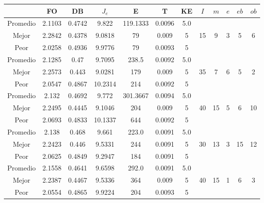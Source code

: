 \begin{table}[h!]
    \footnotesize
    \begin{center}
        \begin{tabular}{|c|c|c|c|c|c|c|c|c|c|c|c|}
        \hline
             & {\bf FO} & {\bf DB} & $J_e$ & {\bf E} & {\bf T} & {\bf KE} & $I$ & $m$ & $e$ & $eb$ & $ob$ \\
        \hline
        \hline
            Promedio  & 2.1103 & 0.4742 & 9.822 & 119.1333 & 0.0096 & 5.0 &  &  &  &  & \\
            \cline{1-7}
            Mejor & 2.2842 & 0.4378  & 9.0818 & 79 & 0.009 & 5 & 15 & 9 & 3 & 5 & 6\\
            \cline{1-7}
            Peor & 2.0258 & 0.4936  & 9.9776 & 79 & 0.0093 & 5 &  &  &  &  & \\
        \hline
        \hline
            Promedio  & 2.1285 & 0.47 & 9.7095 & 238.5 & 0.0092 & 5.0 &  &  &  &  & \\
            \cline{1-7}
            Mejor & 2.2573 & 0.443  & 9.0281 & 179 & 0.009 & 5 & 35 & 7 & 6 & 5 & 2\\
            \cline{1-7}
            Peor & 2.0547 & 0.4867  & 10.2314 & 214 & 0.0092 & 5 &  &  &  &  & \\
        \hline
        \hline
            Promedio  & 2.132 & 0.4692 & 9.772 & 301.3667 & 0.0094 & 5.0 &  &  &  &  & \\
            \cline{1-7}
            Mejor & 2.2495 & 0.4445  & 9.1046 & 204 & 0.009 & 5 & 40 & 15 & 5 & 6 & 10\\
            \cline{1-7}
            Peor & 2.0693 & 0.4833  & 10.1337 & 644 & 0.0092 & 5 &  &  &  &  & \\
        \hline
        \hline
            Promedio  & 2.138 & 0.468 & 9.661 & 223.0 & 0.0091 & 5.0 &  &  &  &  & \\
            \cline{1-7}
            Mejor & 2.2423 & 0.446  & 9.5331 & 244 & 0.0091 & 5 & 30 & 13 & 3 & 15 & 12\\
            \cline{1-7}
            Peor & 2.0625 & 0.4849  & 9.2947 & 184 & 0.0091 & 5 &  &  &  &  & \\
        \hline
        \hline
            Promedio  & 2.1558 & 0.4641 & 9.6598 & 292.0 & 0.0091 & 5.0 &  &  &  &  & \\
            \cline{1-7}
            Mejor & 2.2387 & 0.4467  & 9.5336 & 364 & 0.009 & 5 & 40 & 15 & 1 & 6 & 3\\
            \cline{1-7}
            Peor & 2.0554 & 0.4865  & 9.9224 & 204 & 0.0093 & 5 &  &  &  &  & \\

\end{tabular}
\end{center}
\end{table}
